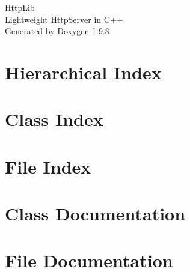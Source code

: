 \documentclass[twoside]{book}
\newcommand{\+}{\discretionary{\mbox{\scriptsize$\hookleftarrow$}}{}{}}
\newcommand{\clearemptydoublepage}{%
    \newpage{\pagestyle{empty}\cleardoublepage}%
  }
\begin{document}
  \raggedbottom
    \hypersetup{pageanchor=false,
                bookmarksnumbered=true,
                pdfencoding=unicode
               }
  \begin{titlepage}
  \vspace*{7cm}
  \begin{center}%
  {\Large Http\+Lib}\\
  [1ex]\large Lightweight Http\+Server in C++ \\
  \vspace*{1cm}
  {\large Generated by Doxygen 1.9.8}\\
  \end{center}
  \end{titlepage}
  \clearemptydoublepage
  \tableofcontents
  \clearemptydoublepage
  \hypersetup{pageanchor=true}
\chapter{Hierarchical Index}

\chapter{Class Index}

\chapter{File Index}

\chapter{Class Documentation}








\chapter{File Documentation}











  \backmatter
  \newpage
  \clearemptydoublepage
  \printindex
\end{document}
